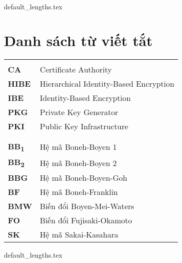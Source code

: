 \documentclass[class=report, crop=false]{standalone}
\begin{document}
	{default_lengths.tex}
	\baselineskip
	\chapter*{Danh sách từ viết tắt}
	\begin{longtabu}{>{\large\bfseries}p{2cm} >{\large}X[l]}
		 \\
		CA						&	Certificate Authority										\\
		HIBE					&	Hierarchical Identity-Based Encryption 						\\
		IBE						&	Identity-Based Encryption 									\\
		PKG						&	Private Key Generator										\\
		PKI						&	Public Key Infrastructure									\\
		\\  \\
		BB\textsubscript{1}		& 	Hệ mã Boneh-Boyen 1 \cite{DBLP:journals/joc/BonehB11} 		\\
		BB\textsubscript{2}		& 	Hệ mã Boneh-Boyen 2 \cite{DBLP:journals/joc/BonehB11}		\\
		BBG						& 	Hệ mã Boneh-Boyen-Goh \cite{DBLP:conf/eurocrypt/BonehBG05} 	\\
		BF 						& 	Hệ mã Boneh-Franklin \cite{DBLP:conf/crypto/BonehF01} 		\\
		BMW 					& 	Biến đổi Boyen-Mei-Waters \cite{DBLP:conf/ccs/BoyenMW05} 	\\
		FO 						& 	Biến đổi Fujisaki-Okamoto \cite{DBLP:conf/crypto/FujisakiO99} 	\\
		SK 						& 	Hệ mã Sakai-Kasahara \cite{DBLP:journals/iacr/SakaiK03} 	\\
	\end{longtabu}
	\newpage
	{default_lengths.tex}
\end{document}
